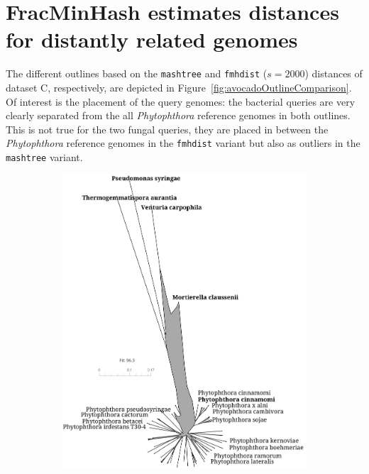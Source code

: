 \section{FracMinHash estimates distances for distantly related genomes}
The different outlines based on the \texttt{mashtree} and \texttt{fmhdist}
($s=2000$) distances of dataset C, respectively, are depicted in
Figure~\ref{fig:avocadoOutlineComparison}. Of interest is the placement of the
query genomes: the bacterial queries are very clearly separated from the all
\textit{Phytophthora} reference genomes in both outlines. This is not true for
the two fungal queries, they are placed in between the \textit{Phytophthora}
reference genomes in the \texttt{fmhdist} variant but also as outliers in the
\texttt{mashtree} variant.

\begin{figure}
  \centering
  \begin{subfigure}{0.49\textwidth}
    \includegraphics[width=1.0\textwidth]{figures/mashtree_avocado4-1_k21_s2000.png}

\end{subfigure}
\end{figure}
